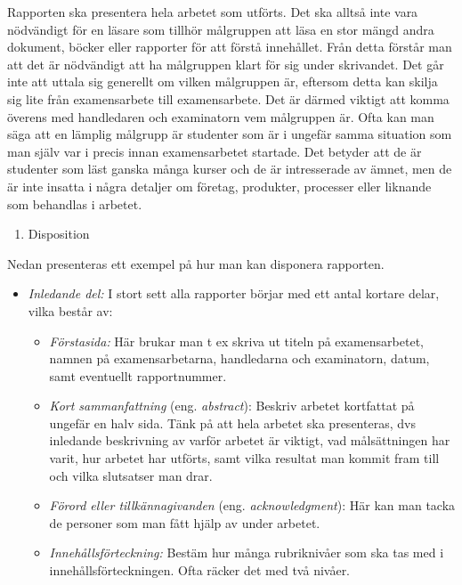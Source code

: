Rapporten ska presentera hela arbetet som utförts. Det ska alltså inte
vara nödvändigt för en läsare som tillhör målgruppen att läsa en stor
mängd andra dokument, böcker eller rapporter för att förstå innehållet.
Från detta förstår man att det är nödvändigt att ha målgruppen klart för
sig under skrivandet. Det går inte att uttala sig generellt om vilken
målgruppen är, eftersom detta kan skilja sig lite från examensarbete
till examensarbete. Det är därmed viktigt att komma överens med
handledaren och examinatorn vem målgruppen är. Ofta kan man säga att en
lämplig målgrupp är studenter som är i ungefär samma situation som man
själv var i precis innan examensarbetet startade. Det betyder att de är
studenter som läst ganska många kurser och de är intresserade av ämnet,
men de är inte insatta i några detaljer om företag, produkter, processer
eller liknande som behandlas i arbetet.

\begin{enumerate}
\def\labelenumi{\arabic{enumi}.}
\item
  Disposition
\end{enumerate}

Nedan presenteras ett exempel på hur man kan disponera rapporten.

\begin{itemize}
\item
  \emph{Inledande del:} I stort sett alla rapporter börjar med ett antal
  kortare delar, vilka består av:

  \begin{itemize}
  \item
    \emph{Förstasida:} Här brukar man t ex skriva ut titeln på
    examensarbetet, namnen på examensarbetarna, handledarna och
    examinatorn, datum, samt eventuellt rapportnummer.
  \item
    \emph{Kort sammanfattning} (eng. \emph{abstract}): Beskriv arbetet
    kortfattat på ungefär en halv sida. Tänk på att hela arbetet ska
    presenteras, dvs inledande beskrivning av varför arbetet är viktigt,
    vad målsättningen har varit, hur arbetet har utförts, samt vilka
    resultat man kommit fram till och vilka slutsatser man drar.
  \item
    \emph{Förord eller tillkännagivanden} (eng. \emph{acknowledgment}):
    Här kan man tacka de personer som man fått hjälp av under arbetet.
  \item
    \emph{Innehållsförteckning:} Bestäm hur många rubriknivåer som ska
    tas med i innehållsförteckningen. Ofta räcker det med två nivåer.
  \end{itemize}
\end{itemize}

